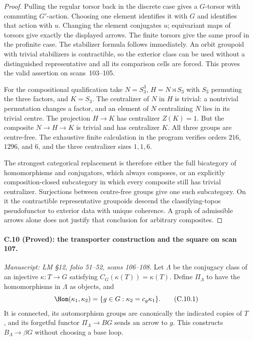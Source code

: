 \begin{proof}
Pulling the regular torsor back in the
discrete case gives a $G$-torsor with
commuting $G'$-action. Choosing one
element identifies it with $G$ and
identifies that action with $u$.
Changing the element conjugates $u$;
equivariant maps of torsors give
exactly the displayed arrows. The
finite torsors give the same proof
in the profinite case. The stabilizer
formula follows immediately. An orbit
groupoid with trivial stabilizers is
contractible, so the exterior class
can be used without a distinguished
representative and all its comparison
cells are forced. This proves the
valid assertion on scans~103--105.

For the compositional qualification
take $N=S_3^3$, $H=N\rtimes S_3$ with
$S_3$ permuting the three factors, and
$K=S_3$. The centralizer of $N$ in
$H$ is trivial: a nontrivial permutation
changes a factor, and an element of
$N$ centralizing $N$ lies in its
trivial centre. The projection
$H\to K$ has centralizer $Z(K)=1$.
But the composite $N\to H\to K$ is
trivial and has centralizer $K$.
All three groups are centre-free.
The exhaustive finite calculation in
the program verifies orders $216$,
$1296$, and $6$, and the three
centralizer sizes $1,1,6$.

The strongest categorical replacement
is therefore either the full
bicategory of homomorphisms and
conjugators, which always composes,
or an explicitly composition-closed
subcategory in which every composite
still has trivial centralizer.
Surjections between centre-free
groups give one such subcategory.
On it the contractible representative
groupoids descend the classifying-topos
pseudofunctor to exterior data with
unique coherence. A graph of admissible
arrows alone does not justify that
conclusion for arbitrary composites.
\end{proof}

\paragraph{C.10 (Proved): the transporter construction and the square on scan 107.}\label{C10}
\textit{Manuscript: LM \S12, folio 51--52, scans 106--108.}
Let $\Lambda$ be the conjugacy class of
an injective $\kappa:T\to G$ satisfying
$C_G(\kappa(T))=\kappa(T)$. Define
$\Pi_\Lambda$ to have the homomorphisms
in $\Lambda$ as objects, and
\[
 \Hom(\kappa_1,\kappa_2)
   =\{g\in G: \kappa_2=c_g\kappa_1\}.
                                                               \tag{C.10.1}
\]
It is connected, its automorphism
groups are canonically the indicated
copies of $T$, and its forgetful
functor $\Pi_\Lambda\to BG$ sends an
arrow to $g$. This constructs
$B_\Lambda\to\beta G$ without choosing
a base loop.

